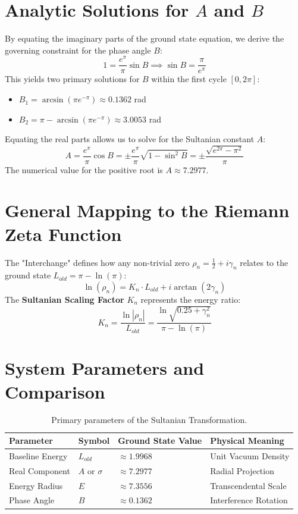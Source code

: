 \documentclass[11pt,a4paper]{article}
\begin{document}
\section{Analytic Solutions for $A$ and $B$}
By equating the imaginary parts of the ground state equation, we derive the governing constraint for the phase angle $B$:
\begin{equation}
    1 = \frac{e^\pi}{\pi} \sin B \implies \sin B = \frac{\pi}{e^\pi}
\end{equation}
This yields two primary solutions for $B$ within the first cycle $[0, 2\pi]$:
\begin{itemize}
    \item $B_1 = \arcsin(\pi e^{-\pi}) \approx 0.1362$ rad
    \item $B_2 = \pi - \arcsin(\pi e^{-\pi}) \approx 3.0053$ rad
\end{itemize}

Equating the real parts allows us to solve for the Sultanian constant $A$:
\begin{equation}
    A = \frac{e^\pi}{\pi} \cos B = \pm \frac{e^\pi}{\pi} \sqrt{1 - \sin^2 B} = \pm \frac{\sqrt{e^{2\pi} - \pi^2}}{\pi}
\end{equation}
The numerical value for the positive root is $A \approx 7.2977$.

\section{General Mapping to the Riemann Zeta Function}
The "Interchange" defines how any non-trivial zero $\rho_n = \frac{1}{2} + i\gamma_n$ relates to the ground state $L_{old} = \pi - \ln(\pi)$:
\begin{equation}
    \ln(\rho_n) = K_n \cdot L_{old} + i \arctan(2\gamma_n)
\end{equation}
The \textbf{Sultanian Scaling Factor} $K_n$ represents the energy ratio:
\begin{equation}
    K_n = \frac{\ln |\rho_n|}{L_{old}} = \frac{\ln \sqrt{0.25 + \gamma_n^2}}{\pi - \ln(\pi)}
\end{equation}

\section{System Parameters and Comparison}

\begin{table}[h!]
\centering
\begin{tabular}{@{}llll@{}}
\toprule
\textbf{Parameter} & \textbf{Symbol} & \textbf{Ground State Value} & \textbf{Physical Meaning} \\ \midrule
Baseline Energy & $L_{old}$ & $\approx 1.9968$ & Unit Vacuum Density \\
Real Component & $A$ or $\sigma$ & $\approx 7.2977$ & Radial Projection \\
Energy Radius & $E$ & $\approx 7.3556$ & Transcendental Scale \\
Phase Angle & $B$ & $\approx 0.1362$ & Interference Rotation \\ \bottomrule
\end{tabular}
\caption{Primary parameters of the Sultanian Transformation.}
\end{table}
\end{document}
